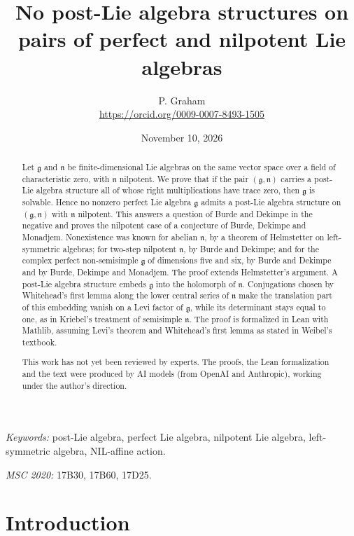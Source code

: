 \documentclass[11pt]{article}
\title{No post-Lie algebra structures on pairs of perfect and nilpotent Lie algebras}
\author{P. Graham\\ \small\url{https://orcid.org/0009-0007-8493-1505}}
\date{November 10, 2026}
\theoremstyle{definition}
\theoremstyle{remark}
\newcommand{\g}{\mathfrak{g}}
\newcommand{\n}{\mathfrak{n}}
\begin{document}
\maketitle
\begin{abstract}
Let $\g$ and $\n$ be finite-dimensional Lie algebras on the same vector
space over a field of characteristic zero, with $\n$ nilpotent. We prove
that if the pair $(\g,\n)$ carries a post-Lie algebra structure all of
whose right multiplications have trace zero, then $\g$ is solvable. Hence
no nonzero perfect Lie algebra $\g$ admits a post-Lie algebra structure on
$(\g,\n)$ with $\n$ nilpotent. This answers a question of Burde and Dekimpe
in the negative and proves the nilpotent case of a conjecture of Burde,
Dekimpe and Monadjem. Nonexistence was known for abelian $\n$, by a theorem of
Helmstetter on left-symmetric algebras; for two-step nilpotent $\n$, by
Burde and Dekimpe; and for the complex perfect
non-semisimple $\g$ of dimensions five and six, by Burde and Dekimpe and by
Burde, Dekimpe and Monadjem. The proof extends Helmstetter's argument. A
post-Lie algebra structure embeds $\g$ into the holomorph of $\n$.
Conjugations chosen by Whitehead's first lemma along the lower central
series of $\n$ make the translation part of this embedding vanish on a
Levi factor of $\g$, while its determinant stays equal to one, as in
Kriebel's treatment of semisimple $\n$. The proof is
formalized in Lean with Mathlib, assuming Levi's theorem and Whitehead's
first lemma as stated in Weibel's textbook.

This work has not yet been reviewed by experts.
The proofs, the Lean formalization and the text were produced by AI models
(from OpenAI and Anthropic), working under the author's direction.
\end{abstract}
\medskip
\noindent\textit{Keywords:} post-Lie algebra, perfect Lie algebra,
nilpotent Lie algebra, left-symmetric algebra, NIL-affine action.

\noindent\textit{MSC 2020:} 17B30, 17B60, 17D25.

\section{Introduction}
\end{document}
